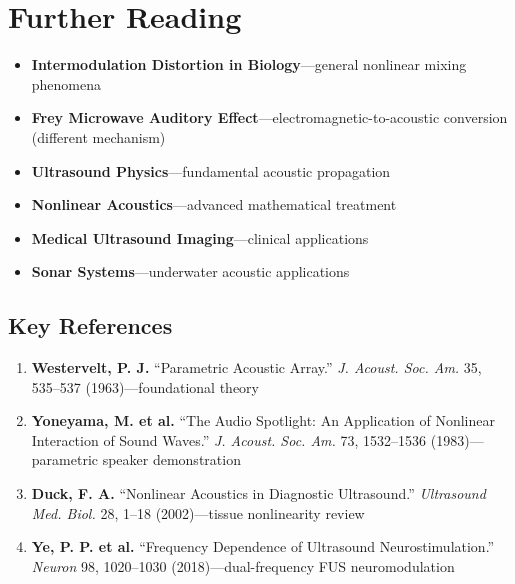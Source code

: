 \section{Further Reading}

\begin{itemize}
\item \textbf{Intermodulation Distortion in Biology}---general nonlinear mixing phenomena
\item \textbf{Frey Microwave Auditory Effect}---electromagnetic-to-acoustic conversion (different mechanism)
\item \textbf{Ultrasound Physics}---fundamental acoustic propagation
\item \textbf{Nonlinear Acoustics}---advanced mathematical treatment
\item \textbf{Medical Ultrasound Imaging}---clinical applications
\item \textbf{Sonar Systems}---underwater acoustic applications
\end{itemize}

\subsection*{Key References}

\begin{enumerate}
\item \textbf{Westervelt, P. J.} ``Parametric Acoustic Array.'' \emph{J. Acoust. Soc. Am.} 35, 535--537 (1963)---foundational theory
\item \textbf{Yoneyama, M. et al.} ``The Audio Spotlight: An Application of Nonlinear Interaction of Sound Waves.'' \emph{J. Acoust. Soc. Am.} 73, 1532--1536 (1983)---parametric speaker demonstration
\item \textbf{Duck, F. A.} ``Nonlinear Acoustics in Diagnostic Ultrasound.'' \emph{Ultrasound Med. Biol.} 28, 1--18 (2002)---tissue nonlinearity review
\item \textbf{Ye, P. P. et al.} ``Frequency Dependence of Ultrasound Neurostimulation.'' \emph{Neuron} 98, 1020--1030 (2018)---dual-frequency FUS neuromodulation
\end{enumerate}
